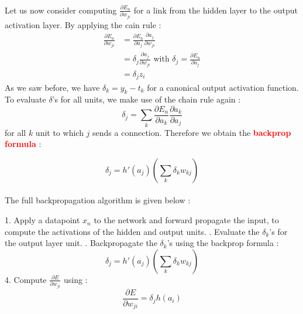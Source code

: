 \documentclass[a4paper]{article}
\begin{document}
{		\paragraph{} Let us now consider computing $\frac{\partial E_n}{\partial w_{ji}}$ for a link from the hidden layer to the output activation layer. By applying the cain rule : 
		\begin{equation}
			\begin{aligned} 
				\frac{\partial E_n}{\partial w_{ji}} &= \frac{\partial{E_n}}{\partial a_j}\frac{\partial a_j}{\partial w_{ji}}\\
									          &= \delta_j \frac{\partial a_j}{\partial w_{ji}} \text{ with } \delta_j = \frac{\partial{E_n}}{\partial a_j} \\
									          &= \delta_j z_i
			\end{aligned}	
		\end{equation}	  
			As we saw before, we have $\delta_k = y_k - t_k$ for a canonical output activation function. \newline
			To evaluate $\delta$'s for all units, we make use of the chain rule again : 
			\begin{equation}
				\delta_j = \sum_{k} \frac{\partial{E_n}}{\partial a_k}\frac{\partial a_k}{\partial a_j}
			\end{equation}
			for all $k$ unit to which $j$ sends a connection. 
			Therefore we obtain the \textbf{\textcolor{red}{backprop formula}} : 
			\vspace{10pt}
			
			{
				\begin{equation}
					\delta_j = h'(a_j)\left( \sum_k \delta_k w_{kj}\right)
				\end{equation}
			}
			
			\paragraph{} The full backpropagation algorithm is given below : 
			\vspace{10pt}
			
			{
				1. Apply a datapoint $x_n$ to the network and forward propagate the input, to compute the activations of the hidden and output units. . Evaluate the $\delta_k$'s for the output layer unit. . Backpropagate the $\delta_k$'s using the backprop formula : 
				\begin{equation}
					\delta_j = h'(a_j)\left( \sum_k \delta_k w_{kj}\right)
				\end{equation}
				4. Compute $\displaystyle\frac{\partial E}{\partial w_{ji}}$ using : 
				\begin{equation}
					\frac{\partial E}{\partial w_{ji}} = \delta_j h(a_i)
				\end{equation}
				}
				
}
\end{document}
